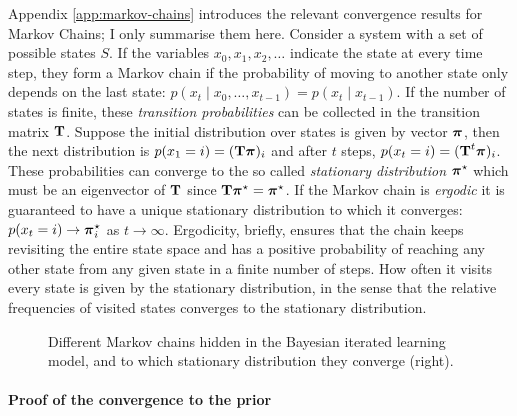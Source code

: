 \documentclass{../src/bcthesispart}
\begin{document}
Appendix \ref{app:markov-chains} introduces the relevant convergence results for Markov Chains; I only summarise them here.
Consider a system with a set of possible states $S$.
If the variables $x_0, x_1, x_2, \dots$ indicate the state at every time step, they form a Markov chain if the probability of moving to another state only depends on the last state: $p(x_t \mid x_0, \dots, x_{t-1}) = p(x_t \mid x_{t-1})$.
If the number of states is finite, these \emph{transition probabilities} can be collected in the transition matrix $\boldsymbol{\mathbf{T}}$.
Suppose the initial distribution over states is given by vector $\boldsymbol{\mathbf{\pi}}$, then the next distribution is $p(x_1 = i) = (\boldsymbol{\mathbf{T}} \boldsymbol{\mathbf{\pi}})_i$ and after $t$ steps, $p(x_t = i) = (\boldsymbol{\mathbf{T}}^t \boldsymbol{\mathbf{\pi}})_i$. 
These probabilities can converge to the so called \emph{stationary distribution} $\boldsymbol{\mathbf{\pi}}^\star$ which must be an eigenvector of $\boldsymbol{\mathbf{T}}$ since $\boldsymbol{\mathbf{T}} \boldsymbol{\mathbf{\pi}}^\star = \boldsymbol{\mathbf{\pi}}^\star$.
If the Markov chain is \emph{ergodic} it is guaranteed to have a unique stationary distribution to which it converges: $p(x_t = i) \to \boldsymbol{\mathbf{\pi}}^\star_i$ as $t\to\infty$.
Ergodicity, briefly, ensures that the chain keeps revisiting the entire state space and has a positive probability of reaching any other state from any given state in a finite number of steps.
How often it visits every state is given by the stationary distribution, in the sense that the relative frequencies of visited states converges to the stationary distribution.




\begin{SCfigure}
	
	
	\caption{Different Markov chains hidden in the Bayesian iterated learning model, and to which stationary distribution they converge (right).
	\label{fig:gk-markov-chains}}
\end{SCfigure}




\paragraph{Proof of the convergence to the prior}
\end{document}
